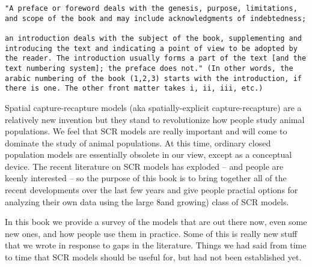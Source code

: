 \begin{verbatim}
"A preface or foreword deals with the genesis, purpose, limitations,
and scope of the book and may include acknowledgments of indebtedness;

an introduction deals with the subject of the book, supplementing and
introducing the text and indicating a point of view to be adopted by
the reader. The introduction usually forms a part of the text [and the
text numbering system]; the preface does not." (In other words, the
arabic numbering of the book (1,2,3) starts with the introduction, if
there is one. The other front matter takes i, ii, iii, etc.)
\end{verbatim}


Spatial capture-recapture models (aka spatially-explicit
capture-recapture) are a relatively new invention but they stand to
revolutionize how people study animal populations. We feel
that SCR models are really important and will come to dominate the
study of animal populations. 
At this time, ordinary closed population
models are essentially obsolete in our view, except as a conceptual
device. The recent literature on SCR models has exploded -- and people are
keenly interested -- so the purpose of this book is to bring together
all of the recent developments over the last few years and give people
practial options for analyzing their own data using the large 8and growing) class of SCR models. 

In this book we
provide a survey of the models that are out there now, even some new
ones, and  how people use them in practice. Some of this is really new
stuff that we wrote in response to gaps in the literature. Things we
had  said from time to time that SCR models should be useful for,
but had not been established yet. 

